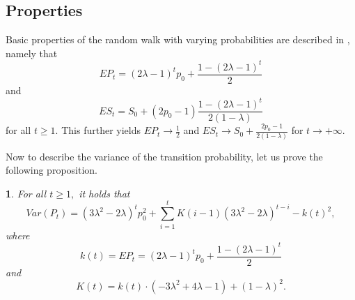 \documentclass{amsart}
\theoremstyle{definition}
\theoremstyle{plain}
\newtheorem{prop}{\protect\propositionname}[section]
\theoremstyle{plain}
\numberwithin{equation}{section}
\providecommand{\propositionname}{Proposition}
\begin{document}
\subsection{Properties}

Basic properties of the random walk with varying probabilities are
described in \cite{ja2019teze}, namely that 
\begin{equation}
EP_{t}=(2\lambda-1)^{t}p_{0}+\frac{1-(2\lambda-1)^{t}}{2}\label{eq:EPt}
\end{equation}
and 
\begin{equation}
ES_{t}=S_{0}+(2p_{0}-1)\frac{1-(2\lambda-1)^{t}}{2(1-\lambda)}\label{eq:ESt}
\end{equation}
 for all $t\geq1$. This further yields $EP_{t}\rightarrow\frac{1}{2}$
and $ES_{t}\rightarrow S_{0}+\frac{2p_{0}-1}{2(1-\lambda)}$ for $t\rightarrow+\infty$.

Now to describe the variance of the transition probability, let us
prove the following proposition.

\begin{prop}
\label{PropVarP-succes}For all $t\geq1,$ it holds that 
\begin{equation}
Var(P_{t})=(3\lambda^{2}-2\lambda)^{t}p_{0}^{2}+\sum_{i=1}^{t}K(i-1)(3\lambda^{2}-2\lambda)^{t-i}-k(t)^{2},\label{eq:VarP-proposition}
\end{equation}
 where 
\[
k(t)=EP_{t}=(2\lambda-1)^{t}p_{0}+\frac{1-(2\lambda-1)^{t}}{2}
\]
 and 
\[
K(t)=k(t)\cdot(-3\lambda^{2}+4\lambda-1)+(1-\lambda)^{2}.
\]
\end{prop}
\end{document}
